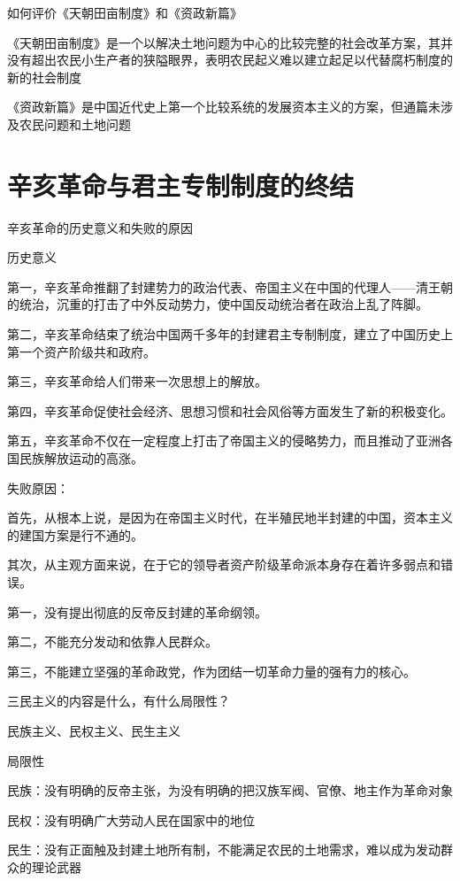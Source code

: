 \documentclass[lang=cn,10pt]{elegantbook}
\begin{document}
	\begin{example}
		如何评价《天朝田亩制度》和《资政新篇》
	\end{example}
	\begin{solution}
		
		《天朝田亩制度》是一个以解决土地问题为中心的比较完整的社会改革方案，其并没有超出农民小生产者的狭隘眼界，表明农民起义难以建立起足以代替腐朽制度的新的社会制度
		
		《资政新篇》是中国近代史上第一个比较系统的发展资本主义的方案，但通篇未涉及农民问题和土地问题
	\end{solution}
	\chapter{辛亥革命与君主专制制度的终结}
	\begin{example}
		辛亥革命的历史意义和失败的原因
	\end{example}
	\begin{solution}
		
		历史意义
		
		第一，辛亥革命推翻了封建势力的政治代表、帝国主义在中国的代理人——清王朝的统治，沉重的打击了中外反动势力，使中国反动统治者在政治上乱了阵脚。
		
		第二，辛亥革命结束了统治中国两千多年的封建君主专制制度，建立了中国历史上第一个资产阶级共和政府。
		
		第三，辛亥革命给人们带来一次思想上的解放。
		
		第四，辛亥革命促使社会经济、思想习惯和社会风俗等方面发生了新的积极变化。
		
		第五，辛亥革命不仅在一定程度上打击了帝国主义的侵略势力，而且推动了亚洲各国民族解放运动的高涨。
		
		
		失败原因：
		
		首先，从根本上说，是因为在帝国主义时代，在半殖民地半封建的中国，资本主义的建国方案是行不通的。
		
		其次，从主观方面来说，在于它的领导者资产阶级革命派本身存在着许多弱点和错误。
		
		第一，没有提出彻底的反帝反封建的革命纲领。
		
		第二，不能充分发动和依靠人民群众。
		
		第三，不能建立坚强的革命政党，作为团结一切革命力量的强有力的核心。
	\end{solution}
	\begin{example}
		
		三民主义的内容是什么，有什么局限性？
	\end{example}
	\begin{solution}
		民族主义、民权主义、民生主义
		
		局限性
		
		民族：没有明确的反帝主张，为没有明确的把汉族军阀、官僚、地主作为革命对象
		
		民权：没有明确广大劳动人民在国家中的地位
		
		民生：没有正面触及封建土地所有制，不能满足农民的土地需求，难以成为发动群众的理论武器
	\end{solution}
\end{document}
